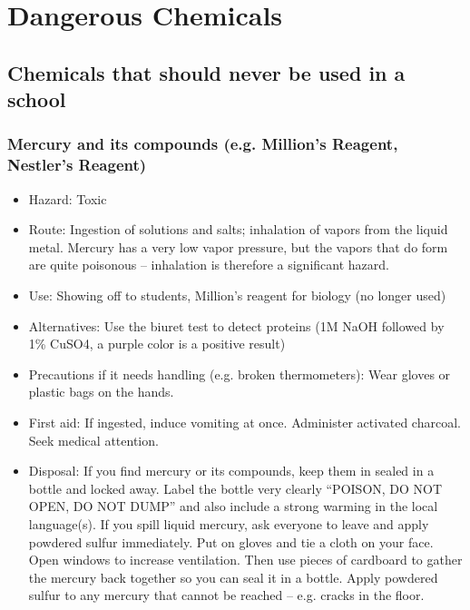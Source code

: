 \chapter{Dangerous Chemicals}
\label{cha:dangerchem}
\section{Chemicals that should never be used in a school}

\subsection{Mercury and its compounds 
(e.g. Million's Reagent, Nestler's Reagent)}

\begin{itemize}

\item{Hazard: Toxic}

\item{Route: Ingestion of solutions and salts; 
inhalation of vapors from the liquid metal. 
Mercury has a very low vapor pressure, 
but the vapors that do form are quite poisonous – 
inhalation is therefore a significant hazard.}

\item{Use: Showing off to students, 
Million's reagent for biology (no longer used)}

\item{Alternatives: Use the biuret test to detect proteins 
(1M NaOH followed by 1\% CuSO4, a purple color is a positive result)}

\item{Precautions if it needs handling (e.g. broken thermometers): 
Wear gloves or plastic bags on the hands.}

\item{First aid: If ingested, induce vomiting at once. 
Administer activated charcoal. Seek medical attention.}

\item{Disposal: If you find mercury or its compounds, 
keep them in sealed in a bottle and locked away. 
Label the bottle very clearly “POISON, DO NOT OPEN, DO NOT DUMP” 
and also include a strong warming in the local language(s). 
If you spill liquid mercury, 
ask everyone to leave and apply powdered sulfur immediately. 
Put on gloves and tie a cloth on your face. 
Open windows to increase ventilation. 
Then use pieces of cardboard to gather the mercury back together 
so you can seal it in a bottle. 
Apply powdered sulfur to any mercury that cannot be reached – 
e.g. cracks in the floor.}

\end{itemize}

